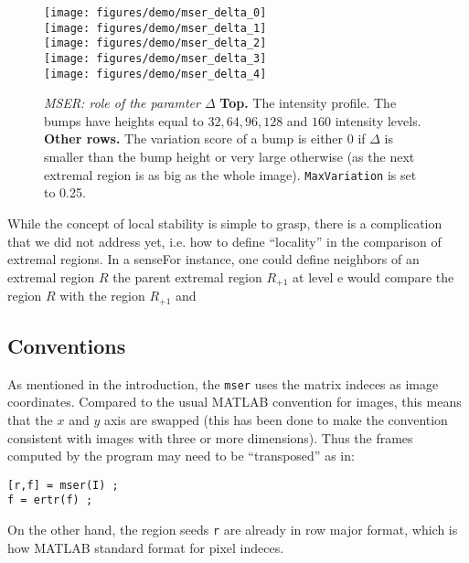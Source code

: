 \documentclass[9pt]{article}
\newcommand{\cmd}  [1]{{\color{red}\tt   #1}}
\newcommand{\param}[1]{{\color{red}\tt   #1}}
\begin{document}
\begin{figure}
\begin{center}
\texttt{[image: figures/demo/mser\_delta\_0]}\\
\texttt{[image: figures/demo/mser\_delta\_1]}\\
\texttt{[image: figures/demo/mser\_delta\_2]}\\
\texttt{[image: figures/demo/mser\_delta\_3]}\\
\texttt{[image: figures/demo/mser\_delta\_4]}
\end{center}
\caption{{\em MSER: role of the paramter $\Delta$} {\bf Top.} The intensity profile. The bumps
have heights equal to $32,64,96,128$ and $160$ intensity levels. {\bf Other rows.} The variation score of a bump is either $0$ if $\Delta$ is smaller than the bump height or very large otherwise (as the next extremal region is as big as the whole image). 
\param{MaxVariation} is set to 0.25.}
\label{fig:mser-delta}
\end{figure}

While the concept of local stability is simple to grasp, there is a
complication that we did not address yet, i.e. how to define
``locality'' in the comparison of extremal regions. In a senseFor
instance, one could define neighbors of an extremal region $R$ the
parent extremal region $R_{+1}$ at level e would compare the region
$R$ with the region $R_{+1}$ and

\subsection{Conventions}\label{mser.command}

As mentioned in the introduction, the \cmd{mser} uses the matrix
indeces as image coordinates. Compared to the usual MATLAB convention
for images, this means that the $x$ and $y$ axis are swapped (this has
been done to make the convention consistent with images with three or
more dimensions). Thus the frames computed by the program may need to
be ``transposed'' as in:
\begin{verbatim}
[r,f] = mser(I) ;
f = ertr(f) ;
\end{verbatim}
On the other hand, the region seeds \verb$r$ are already in row
major format, which is how MATLAB standard format for  pixel indeces.
\end{document}
